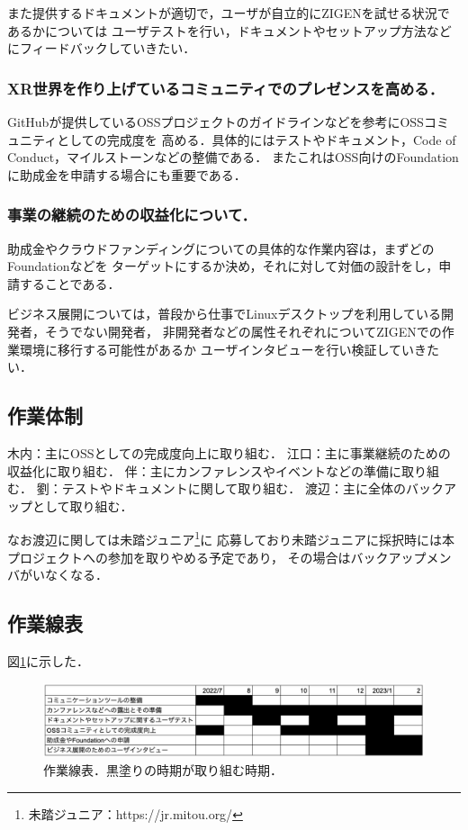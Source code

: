 また提供するドキュメントが適切で，ユーザが自立的にZIGENを試せる状況であるかについては
ユーザテストを行い，ドキュメントやセットアップ方法などにフィードバックしていきたい．

\subsubsection*{XR世界を作り上げているコミュニティでのプレゼンスを高める．}

GitHubが提供しているOSSプロジェクトのガイドラインなどを参考にOSSコミュニティとしての完成度を
高める．具体的にはテストやドキュメント，Code of Conduct，マイルストーンなどの整備である．
またこれはOSS向けのFoundationに助成金を申請する場合にも重要である．

\subsubsection*{事業の継続のための収益化について．}

助成金やクラウドファンディングについての具体的な作業内容は，まずどのFoundationなどを
ターゲットにするか決め，それに対して対価の設計をし，申請することである．

ビジネス展開については，普段から仕事でLinuxデスクトップを利用している開発者，そうでない開発者，
非開発者などの属性それぞれについてZIGENでの作業環境に移行する可能性があるか
ユーザインタビューを行い検証していきたい．

\subsection{作業体制}

木内：主にOSSとしての完成度向上に取り組む．
江口：主に事業継続のための収益化に取り組む．
伴：主にカンファレンスやイベントなどの準備に取り組む．
劉：テストやドキュメントに関して取り組む．
渡辺：主に全体のバックアップとして取り組む．

なお渡辺に関しては未踏ジュニア\footnote{未踏ジュニア：https://jr.mitou.org/}に
応募しており未踏ジュニアに採択時には本プロジェクトへの参加を取りやめる予定であり，
その場合はバックアップメンバがいなくなる．

\subsection{作業線表}

図\ref{fig:biz-schedule}に示した．

\begin{figure}[htbp]
  \centering
  \includegraphics[keepaspectratio, width=\linewidth]{fig/biz-schedule.png}
  \caption{作業線表．黒塗りの時期が取り組む時期．}
  \label{fig:biz-schedule}
\end{figure}


